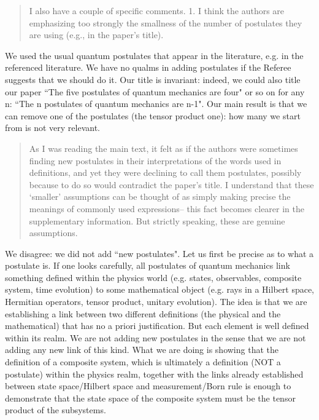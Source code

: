 \documentclass[11pt]{article}
\begin{document}
\begin{quote}
I also have a couple of specific comments. 1. I think the
authors are emphasizing too strongly the smallness of the number of
postulates they are using (e.g., in the paper's title).
\end{quote}

We used the usual quantum postulates that appear in the literature,
e.g. in the referenced literature. We have no qualms in adding
postulates if the Referee suggests that we should do it. Our title is
invariant: indeed, we could also title our paper ``The five postulates
of quantum mechanics are four" or so on for any n: ``The n postulates
of quantum mechanics are n-1". Our main result is that we can remove
one of the postulates (the tensor product one): how many we start from
is not very relevant.

\begin{quote} As I was
reading the main text, it felt as if the authors were sometimes
finding new postulates in their interpretations of the words used in
definitions, and yet they were declining to call them postulates,
possibly because to do so would contradict the paper's title. I
understand that these `smaller' assumptions can be thought of as
simply making precise the meanings of commonly used expressions-- this
fact becomes clearer in the supplementary information. But strictly speaking, these are genuine assumptions.\end{quote}

We disagree: we did not add ``new postulates". 
Let us first be precise as to what a postulate is.
If one looks carefully, all postulates of quantum mechanics link something
defined within the physics world (e.g. states, observables, composite system,
time evolution) to some mathematical object (e.g. rays in a Hilbert space, Hermitian
operators, tensor product, unitary evolution). The idea is that we are
establishing a link between two different definitions (the physical
and the mathematical) that has no a priori justification. But each
element is well defined within its realm. We are not adding new postulates in the sense that we are not adding any
new link of this kind. What we are doing is showing that the definition of 
a composite system, which is ultimately a definition (NOT a postulate) within the physics
realm, together with the links already established between state space/Hilbert
space and measurement/Born rule is enough to demonstrate that the state space of the composite
system must be the tensor product of the subsystems.
\end{document}
